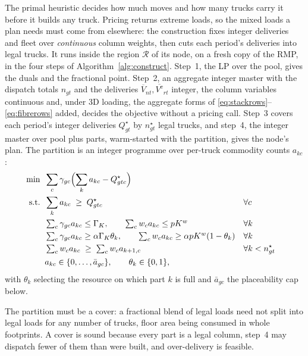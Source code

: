 The primal heuristic decides how much moves and how many trucks carry
it before it builds any truck. Pricing returns extreme loads, so
the mixed loads a plan needs must come from elsewhere: the construction
fixes integer deliveries and fleet over \emph{continuous} column
weights, then cuts each period's deliveries into legal trucks. It runs
inside the region $\mathcal{R}$ of its node, on a fresh copy of the RMP,
in the four steps of Algorithm~\ref{alg:construct}. Step~1, the LP
over the pool, gives the duals and the fractional point. Step~2, an
aggregate integer master with the dispatch totals $n_{gt}$ and the
deliveries $\overline{V}_{nt},\overline{V^{\mathrm{e}}}_{rt}$ integer,
the column variables continuous and, under 3D loading, the aggregate
forms of \eqref{eq:stackrows}--\eqref{eq:fibrerows} added, decides the
objective without a pricing call. Step~3 covers each period's integer
deliveries $Q^{\star}_{gt}$ by $n^{\star}_{gt}$ legal trucks, and
step~4, the integer master over pool plus parts, warm-started with the
partition, gives the node's plan. The partition is an integer
programme over per-truck commodity counts $a_{kc}$:
\begin{align}
  \min\;\;&\sum_{c}\gamma_{gc}\Bigl(\sum_{k}a_{kc}-Q^{\star}_{gtc}\Bigr)
    \label{eq:part-obj}\\
  \text{s.t.}\;\;&\sum_{k}a_{kc}\;\ge\;Q^{\star}_{gtc} &&\forall c
    \label{eq:part-cover}\\
  &\textstyle\sum_{c}\gamma_{gc}a_{kc}\le\Gamma_{K},\qquad
   \sum_{c}w_{c}a_{kc}\le pK^{w} &&\forall k
    \label{eq:part-cap}\\
  &\textstyle\sum_{c}\gamma_{gc}a_{kc}\ge\alpha\Gamma_{K}\theta_{k},\qquad
   \sum_{c}w_{c}a_{kc}\ge\alpha pK^{w}(1-\theta_{k}) &&\forall k
    \label{eq:part-floor}\\
  &\textstyle\sum_{c}w_{c}a_{kc}\;\ge\;\sum_{c}w_{c}a_{k+1,c}
    &&\forall k<n^{\star}_{gt}
    \label{eq:part-sym}\\
  &a_{kc}\in\{0,\dots,\bar a_{gc}\},\qquad \theta_{k}\in\{0,1\},\nonumber
\end{align}
with $\theta_{k}$ selecting the resource on which part $k$ is full and
$\bar a_{gc}$ the placeability cap below.

\noindent The partition must be a cover: a fractional blend of legal
loads need not split into legal loads for any number of trucks, floor
area being consumed in whole footprints. A cover is sound because every
part is a legal column, step~4 may dispatch fewer of them than were
built, and over-delivery is feasible.

